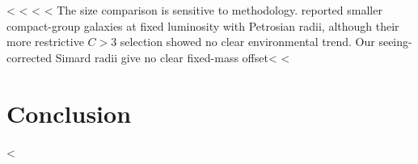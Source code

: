 \documentclass{aa}
\begin{document}
<%
<%
<%
<%
The size comparison is sensitive to methodology. \citet{Coenda+12} reported smaller compact-group galaxies at fixed luminosity with Petrosian radii, although their more restrictive \(C>3\) selection showed no clear environmental trend. Our seeing-corrected Simard radii give no clear fixed-mass offset<%
<%

\section{Conclusion}\label{sec:conclusion}
<%
\end{document}
